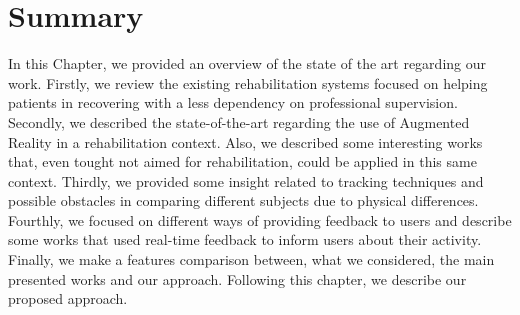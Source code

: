 \begin{table}[!t]
\centering
{}
\caption{Feature comparison with our approach}
\label{table:rwcomparison}
\end{table} 


\section{Summary}

In this Chapter, we provided an overview of the state of the art regarding our work. 
Firstly, we review the existing rehabilitation systems focused on helping patients in recovering with a less dependency on professional supervision.
Secondly, we described the state-of-the-art regarding the use of Augmented Reality in a rehabilitation context. Also, we described some interesting works that, even tought not aimed for rehabilitation, could be applied in this same context.
Thirdly, we provided some insight related to tracking techniques and possible obstacles in comparing different subjects due to physical differences.
Fourthly, we focused on different ways of providing feedback to users and describe some works that used real-time feedback to inform users about their activity.
Finally, we make a features comparison between, what we considered, the main presented works and our approach.
Following this chapter, we describe our proposed approach.
